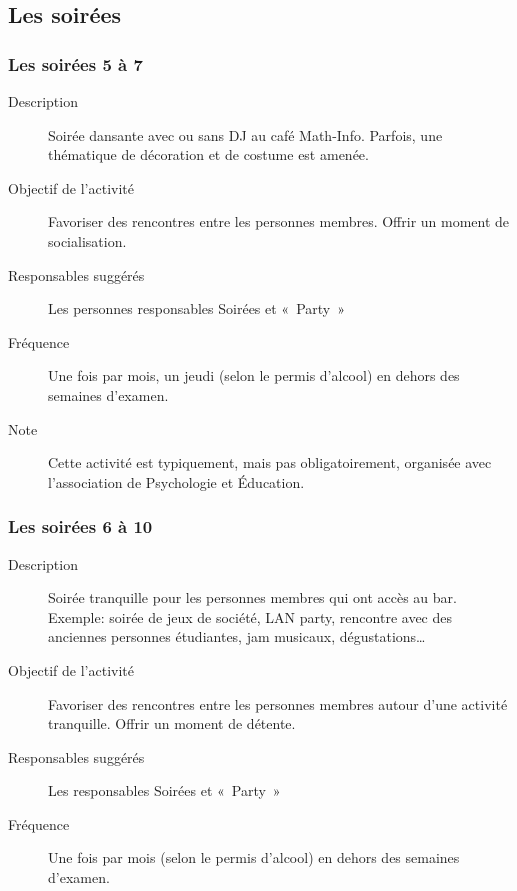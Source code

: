 \documentclass{aediroum}
\begin{document}
\subsection{Les soirées}
\subsubsection{Les soirées 5 à 7}
\begin{description}
	\item[Description] Soirée dansante avec ou sans DJ au café Math-Info. Parfois, une thématique de décoration et de costume est amenée.
	\item[Objectif de l'activité] Favoriser des rencontres entre les personnes membres. Offrir un moment de socialisation.
	\item[Responsables suggérés] Les personnes responsables Soirées et «~Party~»
	\item[Fréquence] Une fois par mois, un jeudi (selon le permis d'alcool) en dehors des semaines d'examen.
	\item[Note] Cette activité est typiquement, mais pas obligatoirement, organisée avec l'association de Psychologie et Éducation.
\end{description}

\subsubsection{Les soirées 6 à 10}
\begin{description}
	\item[Description] Soirée tranquille pour les personnes membres qui ont accès au bar. Exemple: soirée de jeux de société, LAN party, rencontre avec des anciennes personnes étudiantes, jam musicaux, dégustations\ldots{}
	\item[Objectif de l'activité] Favoriser des rencontres entre les personnes membres autour d'une activité tranquille. Offrir un moment de détente.
	\item[Responsables suggérés] Les responsables Soirées et «~Party~»
	\item[Fréquence] Une fois par mois (selon le permis d'alcool) en dehors des semaines d'examen.
\end{description}
\end{document}
